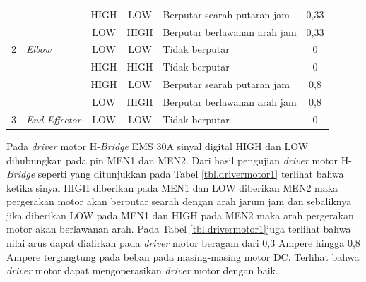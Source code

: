 \begin{longtable}{|c|l|c|c|l|c|}
	&                                                                      & HIGH                         & LOW                          & Berputar searah putaran jam                                            & 0,33                                                \\ \cline{3-6} 
	&                                                                      & LOW                          & HIGH                         & Berputar berlawanan arah jam                                           & 0,33                                                \\ \cline{3-6} 
	\multirow{-4}{*}{2}                          & \multirow{-4}{*}{\textit{Elbow}}                                              & LOW                          & LOW                          & Tidak berputar                                                         & 0                                                   \\ \hline
	&                                                                      & HIGH                         & HIGH                         & Tidak berputar                                                         & 0                                                   \\ \cline{3-6} 
	&                                                                      & HIGH                         & LOW                          & Berputar searah putaran jam                                            & 0,8                                                 \\ \cline{3-6} 
	&                                                                      & LOW                          & HIGH                         & Berputar berlawanan arah jam                                           & 0,8                                                 \\ \cline{3-6} 
	\multirow{-4}{*}{3}                          & \multirow{-4}{*}{\textit{End-Effector}}                                       & LOW                          & LOW                          & Tidak berputar                                                         & 0                                                   \\ \hline
\end{longtable}
 Pada \textit{driver} motor H-\textit{Bridge} EMS 30A sinyal digital HIGH dan LOW dihubungkan pada pin MEN1 dan MEN2. Dari hasil pengujian \textit{driver} motor H-\textit{Bridge} seperti yang ditunjukkan pada Tabel \ref{tbl.drivermotor1} terlihat bahwa ketika sinyal HIGH diberikan pada MEN1 dan LOW diberikan MEN2 maka pergerakan motor akan berputar searah dengan arah jarum jam dan sebaliknya jika diberikan LOW pada MEN1 dan HIGH pada MEN2 maka arah pergerakan motor akan berlawanan arah. Pada Tabel \ref{tbl.drivermotor1}juga terlihat bahwa nilai arus dapat dialirkan pada \textit{driver} motor beragam dari 0,3 Ampere hingga 0,8 Ampere tergangtung pada beban pada masing-masing motor DC. Terlihat bahwa \textit{driver} motor dapat mengoperasikan \textit{driver} motor dengan baik.

